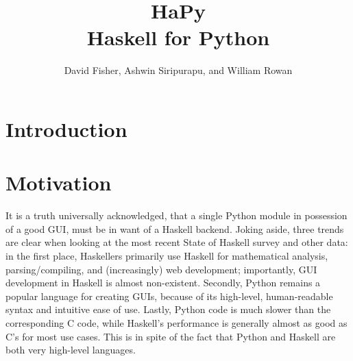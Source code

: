 \documentclass[11pt, letterpaper, oneside, twocolumn] {article}
\begin{document}
\title{HaPy \\
Haskell for Python
}
\author{David Fisher, Ashwin Siripurapu, and William Rowan}
\maketitle

\section{Introduction}

\section{Motivation}
It is a truth universally acknowledged, that a single Python module in possession of a good GUI, must be in want of a Haskell backend. Joking aside, three trends are clear when looking at the most recent State of Haskell survey and other data: in the first place, Haskellers primarily use Haskell for mathematical analysis, parsing/compiling, and (increasingly) web development; importantly, GUI development in Haskell is almost non-existent. Secondly, Python remains a popular language for creating GUIs, because of its high-level, human-readable syntax and intuitive ease of use. Lastly, Python code is much slower than the corresponding C code, while Haskell's performance is generally almost as good as C's for most use cases. This is in spite of the fact that Python and Haskell are both very high-level languages. 
\end{document}
